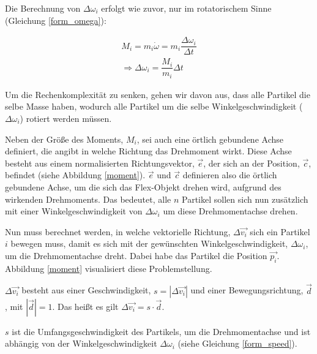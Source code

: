 Die Berechnung von $\Delta \omega_i$ erfolgt wie zuvor, nur im rotatorischem Sinne (Gleichung \ref{form_omega}):

\begin{equation}
\begin{split}
M_i = m_i   \dot{\omega} = m_i \dfrac{\Delta \omega_i}{\Delta t} \\
\Rightarrow  \Delta \omega_i = \dfrac{M_i}{m_i} \Delta t
\end{split}
\label{form_omega}
\end{equation}

Um die Rechenkomplexität zu senken, gehen wir davon aus, dass alle Partikel die selbe Masse haben, wodurch alle Partikel um die selbe Winkelgeschwindigkeit ($\Delta \omega_i$) rotiert werden müssen. 

Neben der Größe des Moments, $M_i$, sei auch eine örtlich gebundene Achse definiert, die angibt in welche Richtung das Drehmoment wirkt. Diese Achse besteht aus einem normalisierten Richtungsvektor, $\vec{e}$, der sich an der Position, $\vec{c}$, befindet (siehe Abbildung \ref{moment}). $\vec{e}$ und $\vec{c}$ definieren also die örtlich gebundene Achse, um die sich das Flex-Objekt drehen wird, aufgrund des wirkenden Drehmoments. Das bedeutet, alle $n$ Partikel sollen sich nun zusätzlich mit einer Winkelgeschwindigkeit von $\Delta \omega_i$ um diese Drehmomentachse drehen.

Nun muss berechnet werden, in welche vektorielle Richtung, $\Delta \vec{v_i}$ sich ein Partikel $i$ bewegen muss, damit es sich mit der gewünschten Winkelgeschwindigkeit, $\Delta \omega_i$, um die Drehmomentachse dreht. Dabei habe das Partikel die Position $\vec{p_i}$. Abbildung \ref{moment} visualisiert diese Problemstellung.



$\Delta \vec{v_i}$ besteht aus einer Geschwindigkeit, $s=|\Delta \vec{v_i}|$ und einer Bewegungsrichtung, $\vec{d}$, mit $|\vec{d}|=1$. Das heißt es gilt $\Delta \vec{v_i} = s \cdot \vec{d}$.

$s$ ist die Umfangsgeschwindigkeit des Partikels, um die Drehmomentachse und ist abhängig von der Winkelgeschwindigkeit $\Delta \omega_i$ (siehe Gleichung \ref{form_speed}).

